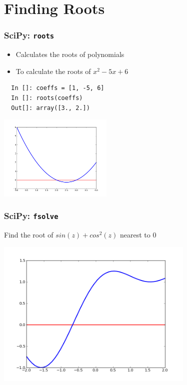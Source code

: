 \documentclass[14pt,compress]{beamer}
\newcommand{\typ}[1]{\lstinline{#1}}
\begin{document}
\section{Finding Roots}

\begin{frame}[fragile]
\frametitle{SciPy: \typ{roots}}
\begin{itemize}
\item Calculates the roots of polynomials
\item To calculate the roots of $x^2-5x+6$ 
\end{itemize}
\begin{lstlisting}
  In []: coeffs = [1, -5, 6]
  In []: roots(coeffs)
  Out[]: array([3., 2.])
\end{lstlisting}
\vspace*{-.2in}
\begin{center}
\includegraphics[height=1.6in, interpolate=true]{data/roots}    
\end{center}
\end{frame}

\begin{frame}[fragile]
\frametitle{SciPy: \typ{fsolve}}
Find the root of $sin(z)+cos^2(z)$ nearest to $0$
\vspace{-0.1in}
\begin{center}
\includegraphics[height=2.8in, interpolate=true]{data/fsolve}    
\end{center}
\end{frame}
\end{document}
